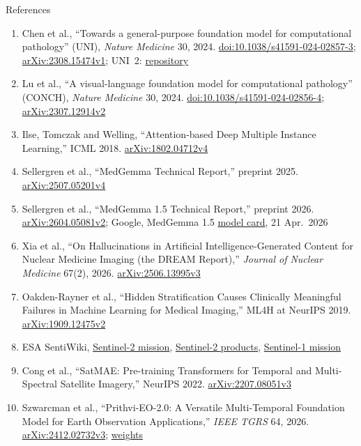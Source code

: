 \begin{frame}[allowframebreaks=0.9]{References}
\begin{enumerate}
    \item Chen et al., ``Towards a general-purpose foundation model for computational pathology'' (UNI), \textit{Nature Medicine} 30, 2024. \href{https://doi.org/10.1038/s41591-024-02857-3}{doi:10.1038/s41591-024-02857-3}; \href{https://arxiv.org/abs/2308.15474v1}{arXiv:2308.15474v1}; UNI~2: \href{https://github.com/mahmoodlab/UNI}{repository}
    \item Lu et al., ``A visual-language foundation model for computational pathology'' (CONCH), \textit{Nature Medicine} 30, 2024. \href{https://doi.org/10.1038/s41591-024-02856-4}{doi:10.1038/s41591-024-02856-4}; \href{https://arxiv.org/abs/2307.12914v2}{arXiv:2307.12914v2}
    \item Ilse, Tomczak and Welling, ``Attention-based Deep Multiple Instance Learning,'' ICML 2018. \href{https://arxiv.org/abs/1802.04712v4}{arXiv:1802.04712v4}
    \item Sellergren et al., ``MedGemma Technical Report,'' preprint 2025. \href{https://arxiv.org/abs/2507.05201v4}{arXiv:2507.05201v4}
    \item Sellergren et al., ``MedGemma 1.5 Technical Report,'' preprint 2026. \href{https://arxiv.org/abs/2604.05081v2}{arXiv:2604.05081v2}; Google, MedGemma 1.5 \href{https://developers.google.com/health-ai-developer-foundations/medgemma/model-card}{model card}, 21 Apr.\ 2026
    \item Xia et al., ``On Hallucinations in Artificial Intelligence-Generated Content for Nuclear Medicine Imaging (the DREAM Report),'' \textit{Journal of Nuclear Medicine} 67(2), 2026. \href{https://arxiv.org/abs/2506.13995v3}{arXiv:2506.13995v3}
    \item Oakden-Rayner et al., ``Hidden Stratification Causes Clinically Meaningful Failures in Machine Learning for Medical Imaging,'' ML4H at NeurIPS 2019. \href{https://arxiv.org/abs/1909.12475v2}{arXiv:1909.12475v2}
    \item ESA SentiWiki, \href{https://sentiwiki.copernicus.eu/web/s2-mission}{Sentinel-2 mission}, \href{https://sentiwiki.copernicus.eu/web/s2-products}{Sentinel-2 products}, \href{https://sentiwiki.copernicus.eu/web/s1-mission}{Sentinel-1 mission}
    \item Cong et al., ``SatMAE: Pre-training Transformers for Temporal and Multi-Spectral Satellite Imagery,'' NeurIPS 2022. \href{https://arxiv.org/abs/2207.08051v3}{arXiv:2207.08051v3}
    \item Szwarcman et al., ``Prithvi-EO-2.0: A Versatile Multi-Temporal Foundation Model for Earth Observation Applications,'' \textit{IEEE TGRS} 64, 2026. \href{https://arxiv.org/abs/2412.02732v3}{arXiv:2412.02732v3}; \href{https://huggingface.co/ibm-nasa-geospatial/Prithvi-EO-2.0-300M}{weights}

\end{enumerate}
\end{frame}
